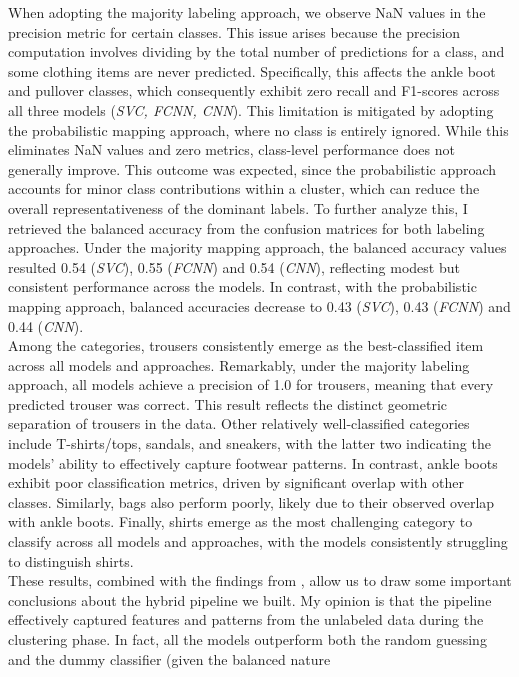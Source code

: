 When adopting the majority labeling approach, we observe NaN values in the precision metric for certain classes. 
This issue arises because the precision computation involves dividing by the total number of predictions for a class, 
and some clothing items are never predicted. Specifically, this affects the ankle boot and pullover classes, which 
consequently exhibit zero recall and F1-scores across all three models (\emph{SVC, FCNN, CNN}). This limitation is mitigated 
by adopting the probabilistic mapping approach, where no class is entirely ignored. While this eliminates NaN values 
and zero metrics, class-level performance does not generally improve. This outcome was expected, since the probabilistic 
approach accounts for minor class contributions within a cluster, which can reduce the overall representativeness of the 
dominant labels. To further analyze this, I retrieved the balanced accuracy from the confusion matrices for both labeling approaches. 
Under the majority mapping approach, the balanced accuracy values resulted 0.54 (\emph{SVC}), 0.55 (\emph{FCNN}) and 0.54 (\emph{CNN}), reflecting modest 
but consistent performance across the models. In contrast, with the probabilistic mapping approach, balanced accuracies decrease
to 0.43 (\emph{SVC}), 0.43 (\emph{FCNN}) and 0.44 (\emph{CNN}).\\[0.2cm]
Among the categories, trousers consistently emerge as the best-classified item across all models and approaches. Remarkably, under the 
majority labeling approach, all models achieve a precision of 1.0 for trousers, meaning that every predicted trouser was correct. This 
result reflects the distinct geometric separation of trousers in the data. Other relatively well-classified categories include T-shirts/tops, 
sandals, and sneakers, with the latter two indicating the models' ability to effectively capture footwear patterns. In contrast, ankle boots 
exhibit poor classification metrics, driven by significant overlap with other classes. Similarly, bags also perform poorly, 
likely due to their observed overlap with ankle boots. Finally, shirts emerge as the most challenging category to classify across all 
models and approaches, with the models consistently struggling to distinguish shirts.\\[0.2cm]
These results, combined with the findings from , allow us to draw some important conclusions about the 
hybrid pipeline we built. My opinion is that the pipeline effectively captured features and patterns from the unlabeled data during 
the clustering phase. In fact, all the models outperform both the random guessing and the dummy classifier (given the balanced nature 
